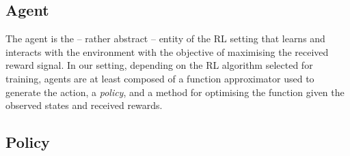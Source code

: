 \subsection{Agent}

The agent is the -- rather abstract -- entity of the \ac{RL} setting that learns and interacts with the environment with the objective of maximising the received reward signal.
In our setting, depending on the \ac{RL} algorithm selected for training, agents are at least composed of a function approximator used to generate the action, \ie a \emph{policy}, and a method for optimising the function given the observed states and received rewards.

\subsection{Policy}


